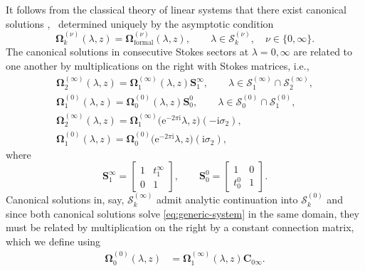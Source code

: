\documentclass[11pt]{article}
\numberwithin{equation}{section}
\numberwithin{equation}{section}
\newcommand{\ee}{\mathrm{e}}
\newcommand{\ii}{\mathrm{i}}
\begin{document}
It follows from the classical theory of linear systems that there exist canonical solutions ,~ determined uniquely by the asymptotic condition
\begin{equation}
\mathbf{\Omega}_k^{(\nu)}(\lambda, z) = \mathbf{\Omega}^{(\nu)}_{\text{formal}}(\lambda, z), \qquad \lambda \in \mathcal S_k^{(\nu)}, \quad \nu \in \{0, \infty\}.
\label{eq:psi-asymptotic-condition-D8}
\end{equation}
The canonical solutions in consecutive Stokes sectors at $\lambda=0,\infty$ are related to one another by multiplications on the right with Stokes matrices, i.e.,
\begin{gather}%
\label{eq:stokes-condition-D8-1}\mathbf{\Omega}_2^{(\infty)}(\lambda, z) = \mathbf{\Omega}_1^{(\infty)}(\lambda,z) \mathbf{S}^{\infty}_{1},\qquad \lambda\in \mathcal S_1^{(\infty)}\cap \mathcal S_2^{(\infty)},\\
\mathbf{\Omega}_1^{(0)}(\lambda, z) = \mathbf{\Omega}_0^{(0)}(\lambda, z) \mathbf{S}^{0}_{0}, \qquad \lambda\in \mathcal S_0^{(0)}\cap \mathcal S_1^{(0)}, \\
\mathbf{\Omega}_{2}^{(\infty)}(\lambda, z) = \mathbf{\Omega}_1^{(\infty)}\big(\ee^{-2\pi \ii} \lambda, z\big) (-\ii\sigma_2), \\
\label{eq:stokes-condition-D8-4}\mathbf{\Omega}_{1}^{(0)}(\lambda, z) = \mathbf{\Omega}_0^{(0)}\big(\ee^{-2\pi \ii} \lambda, z\big) (\ii\sigma_2),
\end{gather}
where
\begin{equation}
\mathbf{S}^\infty_{1}= \begin{bmatrix}1&t^\infty_1\\0&1\end{bmatrix},\qquad \mathbf{S}^0_{{0}}=
 \begin{bmatrix}1&0\\{t^0_0}&1\end{bmatrix} .
 \label{eq:Stokes-zero}
\end{equation}
Canonical solutions in, say, $\mathcal S_k^{(\infty)}$ admit analytic continuation into $\mathcal S_k^{(0)}$ and since both canonical solutions solve \eqref{eq:generic-system} in the same domain, they must be related by multiplication on the right by a constant connection matrix, which we define using
\begin{align}
\mathbf{\Omega}_0^{(0)}(\lambda, z) &= \mathbf{\Omega}_1^{(\infty)}(\lambda, z) \mathbf{C}_{0\infty}.
\label{eq:connection-matrix-D8}
\end{align}
\end{document}

